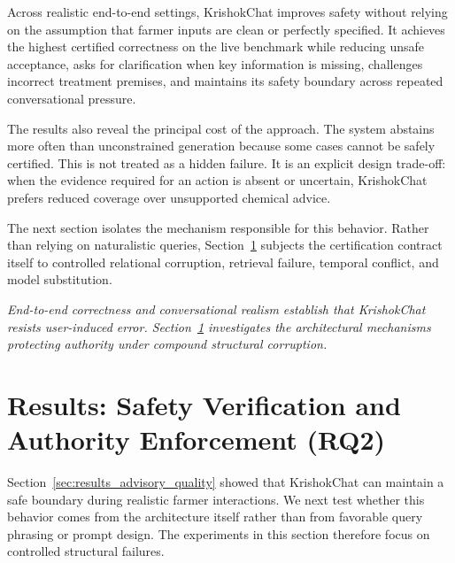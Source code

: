 \documentclass[a4paper,fleqn]{cas-dc}
\begin{document}
Across realistic end-to-end settings, KrishokChat improves safety without relying on the assumption that farmer inputs are clean or perfectly specified. It achieves the highest certified correctness on the live benchmark while reducing unsafe acceptance, asks for clarification when key information is missing, challenges incorrect treatment premises, and maintains its safety boundary across repeated conversational pressure.

The results also reveal the principal cost of the approach. The system abstains more often than unconstrained generation because some cases cannot be safely certified. This is not treated as a hidden failure. It is an explicit design trade-off: when the evidence required for an action is absent or uncertain, KrishokChat prefers reduced coverage over unsupported chemical advice.

The next section isolates the mechanism responsible for this behavior. Rather than relying on naturalistic queries, Section~\ref{sec:results_authority_safety} subjects the certification contract itself to controlled relational corruption, retrieval failure, temporal conflict, and model substitution.

\medskip
\noindent\textit{End-to-end correctness and conversational realism establish that KrishokChat resists user-induced error. Section~\ref{sec:results_authority_safety} investigates the architectural mechanisms protecting authority under compound structural corruption.}


\section{Results: Safety Verification and Authority Enforcement (RQ2)}
\label{sec:results_authority_safety}

Section~\ref{sec:results_advisory_quality} showed that KrishokChat can maintain a safe boundary during realistic farmer interactions. We next test whether this behavior comes from the architecture itself rather than from favorable query phrasing or prompt design. The experiments in this section therefore focus on controlled structural failures.
\end{document}
